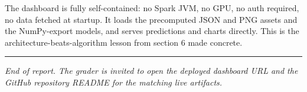 \documentclass[11pt,letterpaper]{article}
\begin{document}
The dashboard is fully self-contained: no Spark JVM, no GPU, no auth required, no data fetched at startup. It loads the precomputed JSON and PNG assets and the NumPy-export models, and serves predictions and charts directly. This is the architecture-beats-algorithm lesson from section 6 made concrete.

\vspace{1cm}

\hrule

\vspace{0.5cm}

\noindent \textit{End of report. The grader is invited to open the deployed dashboard URL and the GitHub repository README for the matching live artifacts.}
\end{document}

